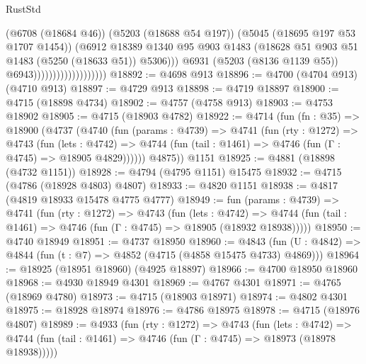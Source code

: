 \begin{lexlean}{RustStd}
\begin{coremodule}
                                            (@6708 (@18684 @46))
                                            (@5203 (@18688 @54 @197))
                                            (@5045 (@18695 @197 @53 @1707 @1454))
                                            (@6912
                                              @18389
                                              @1340
                                              @95
                                              @903
                                              @1483
                                              (@18628
                                                @51
                                                @903
                                                @51
                                                @1483
                                                (@5250 (@18633 @51))
                                                @5306)))
                                          @6931
                                          (@5203 (@8136 @1139 @55))
                                          @6943)))))))))))))))))))
@18892 := @4698 @913
@18896 := @4700 (@4704 @913) (@4710 @913)
@18897 := @4729 @913
@18898 := @4719 @18897
@18900 := @4715 (@18898 @4734)
@18902 := @4757 (@4758 @913)
@18903 := @4753 @18902
@18905 := @4715 (@18903 @4782)
@18922 := @4714
    (fun (fn : @35) =>
    @18900
      (@4737
        (@4740
          (fun (params : @4739) =>
          @4741
            (fun (rty : @1272) =>
            @4743
              (fun (lets : @4742) =>
              @4744 (fun (tail : @1461) => @4746 (fun (Γ : @4745) => @18905 @4829))))))
        @4875))
    @1151
@18925 := @4881 (@18898 (@4732 @1151))
@18928 := @4794 (@4795 @1151) @15475
@18932 := @4715 (@4786 (@18928 @4803) @4807)
@18933 := @4820 @1151
@18938 := @4817 (@4819 @18933 @15478 @4775 @4777)
@18949 := fun (params : @4739) =>
  @4741
    (fun (rty : @1272) =>
    @4743
      (fun (lets : @4742) =>
      @4744 (fun (tail : @1461) => @4746 (fun (Γ : @4745) => @18905 (@18932 @18938)))))
@18950 := @4740 @18949
@18951 := @4737 @18950
@18960 := @4843
    (fun (U : @4842) => @4844 (fun (t : @7) => @4852 (@4715 (@4858 @15475 @4733) @4869)))
@18964 := @18925 (@18951 @18960) (@4925 @18897)
@18966 := @4700 @18950 @18960
@18968 := @4930 @18949 @4301
@18969 := @4767 @4301
@18971 := @4765 (@18969 @4780)
@18973 := @4715 (@18903 @18971)
@18974 := @4802 @4301
@18975 := @18928 @18974
@18976 := @4786 @18975
@18978 := @4715 (@18976 @4807)
@18989 := @4933
    (fun (rty : @1272) =>
    @4743
      (fun (lets : @4742) =>
      @4744 (fun (tail : @1461) => @4746 (fun (Γ : @4745) => @18973 (@18978 @18938)))))

\end{coremodule}
\end{lexlean}
